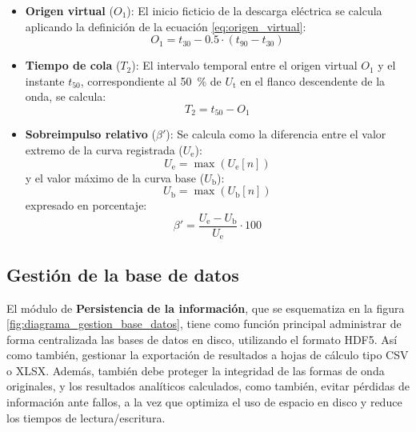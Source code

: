 \begin{enumerate}[resume]
\begin{itemize}
        \begin{equation}
            T_1 = \frac{t_{90} - t_{30}}{\num{0.6}}
            \label{eq:tiempo_frente_2}
        \end{equation}
        \item \textbf{Origen virtual} ($O_1$): El inicio ficticio de la descarga eléctrica se calcula aplicando la definición de la ecuación \ref{eq:origen_virtual}:
        \begin{equation}
            O_1 = t_{30} - 0.5 \cdot (t_{90} - t_{30})
            \label{eq:origen_virtual_2}
        \end{equation}
        \item \textbf{Tiempo de cola} ($T_2$): El intervalo temporal entre el origen virtual $O_1$ y el instante $t_{50}$, correspondiente al \qty{50}{\percent} de $U_\text{t}$ en el flanco descendente de la onda, se calcula:
        \begin{equation}
            T_2 = t_{50} - O_1
            \label{eq:tiempo_cola}
        \end{equation}
        \item \textbf{Sobreimpulso relativo} ($\beta'$): Se calcula como la diferencia entre el valor extremo de la curva registrada ($U_\text{e}$):
        \begin{equation}
            U_\text{e} = \max(U_\text{e}[n])
            \label{eq:max_curva_registrada}
        \end{equation}
        y el valor máximo de la curva base ($U_\text{b}$):
        \begin{equation}
            U_\text{b} = \max(U_\text{b}[n])
            \label{eq:max_curva_base}
        \end{equation}
        expresado en porcentaje:
        \begin{equation}
            \beta' = \frac{U_\text{e} - U_\text{b}}{U_\text{e}} \cdot \num{100}
            \label{eq:sobreimpulso_relativo}
        \end{equation}
    \end{itemize}
\end{enumerate}

\subsection{Gestión de la base de datos}
\label{subsec:gestion_base_datos}

El módulo de \textbf{Persistencia de la información}, que se esquematiza en la figura \ref{fig:diagrama_gestion_base_datos}, tiene como función principal administrar de forma centralizada las bases de datos en disco, utilizando el formato HDF5. Así como también, gestionar la exportación de resultados a hojas de cálculo tipo CSV o XLSX. Además, también debe proteger la integridad de las formas de onda originales, y los resultados analíticos calculados, como también, evitar pérdidas de información ante fallos, a la vez que optimiza el uso de espacio en disco y reduce los tiempos de lectura/escritura.

